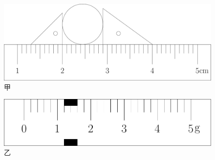 \documentclass[12pt,twoside]{exam}
\begin{document}
\begin{knowledge}
\newpage
\vspace*{40pt}
\noindent
\begin{minipage}{\textwidth}
\begin{minipage}[c][6cm][c]{0.78\textwidth}
\begin{figure}[H]
\includegraphics[width=\linewidth]{figures/2013湖北黄冈34甲.pdf} 
\caption{甲}
\end{figure}
\begin{figure}[H]
\includegraphics[width=\linewidth]{figures/2013湖北黄冈34乙.pdf} 
\caption{乙}
\end{figure}
\end{minipage}\hfill
\begin{minipage}[c][6cm][c]{0.2\textwidth}
\begin{figure}[H]
\centering

\end{figure}
\end{minipage}
\end{minipage}
\end{knowledge}
\end{document}
